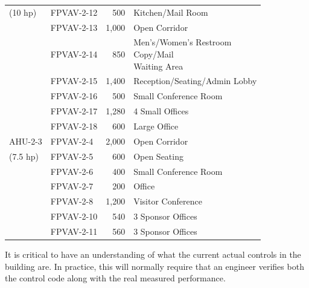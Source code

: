 \begin{table}[]
\begin{tabular}{@{}llrl@{}}
(10 hp)  & FPVAV-2-12 & 500   & Kitchen/Mail Room                                                        \\ \cmidrule(r){2-4}
         & FPVAV-2-13 & 1,000 & Open Corridor                                                            \\ \cmidrule(r){2-4}
         & FPVAV-2-14 & 850   & \pbox{\textwidth}{Men's/Women's Restroom \\ Copy/Mail  \\ Waiting Area } \\ \cmidrule(r){2-4}
         & FPVAV-2-15 & 1,400 & Reception/Seating/Admin Lobby                                            \\ \cmidrule(r){2-4}
         & FPVAV-2-16 & 500   & Small Conference Room                                                    \\ \cmidrule(r){2-4}
         & FPVAV-2-17 & 1,280 & 4 Small Offices                                                          \\ \cmidrule(r){2-4}
         & FPVAV-2-18 & 600   & Large Office                                                             \\ \midrule
AHU-2-3  & FPVAV-2-4  & 2,000 & Open Corridor                                                            \\ \cmidrule(r){2-4}
(7.5 hp) & FPVAV-2-5  & 600   & Open Seating                                                             \\ \cmidrule(r){2-4}
         & FPVAV-2-6  & 400   & Small Conference Room                                                    \\ \cmidrule(r){2-4}
         & FPVAV-2-7  & 200   & Office                                                                   \\ \cmidrule(r){2-4}
         & FPVAV-2-8  & 1,200 & Visitor Conference                                                       \\ \cmidrule(r){2-4}
         & FPVAV-2-10 & 540   & 3 Sponsor Offices                                                        \\ \cmidrule(r){2-4}
         & FPVAV-2-11 & 560   & 3 Sponsor Offices                                                        \\ \bottomrule
\end{tabular}
\end{table}

It is critical to have an understanding of what the current actual controls in
the building are. In practice, this will normally require that an engineer
verifies both the control code along with the real measured performance.

